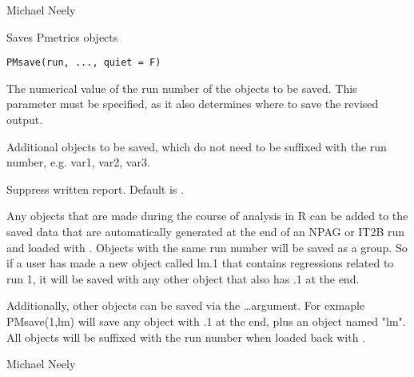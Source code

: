 \documentclass[a4paper]{book}
\begin{document}
%
\begin{Author}\relax
Michael Neely
\end{Author}
%
\begin{Description}\relax
Saves Pmetrics objects
\end{Description}
%
\begin{Usage}
\begin{verbatim}
PMsave(run, ..., quiet = F)
\end{verbatim}
\end{Usage}
%
\begin{Arguments}
\begin{ldescription}
\item[\code{run}] The numerical value of the run number of the objects to be saved.
This parameter must be specified, as it also determines where to save the revised output.

\item[\code{...}] Additional objects to be saved, which do not need to be suffixed with the run number,
e.g. var1, var2, var3.

\item[\code{quiet}] Suppress written report.  Default is .
\end{ldescription}
\end{Arguments}
%
\begin{Details}\relax
Any objects that are made during the course of analysis in R can be added to the saved data
that are automatically generated at the end of an NPAG or IT2B run and loaded with .
Objects with the same run number will be saved as a group.  So if a user has made a new object called
lm.1 that contains regressions related to run 1, it will be saved with any other object
that also has .1 at the end. 

Additionally, other objects can be saved via the \dots argument.  For exmaple PMsave(1,lm) will
save any object with .1 at the end, plus an object named "lm".  All objects will be suffixed
with the run number when loaded back with .
\end{Details}
%
\begin{Author}\relax
Michael Neely
\end{Author}
%
\begin{SeeAlso}\relax
{}
\end{SeeAlso}
\end{document}
